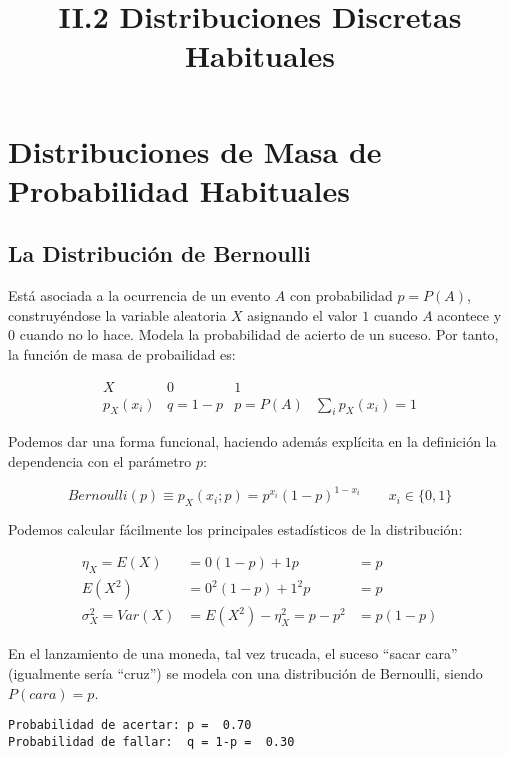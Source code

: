 \documentclass[11pt]{article}
\title{II.2 Distribuciones Discretas Habituales}
\begin{document}
    
    
    \maketitle
    
    \hypertarget{ii.-2-distribuciones-de-masa-de-probabilidad-habituales}{%
\section*{Distribuciones de Masa de Probabilidad
Habituales}\label{ii.-2-distribuciones-de-masa-de-probabilidad-habituales}}

\hypertarget{la-distribuciuxf3n-de-bernoulli}{%
\subsection*{La Distribución de
Bernoulli}\label{la-distribuciuxf3n-de-bernoulli}}

Está asociada a la ocurrencia de un evento \(A\) con probabilidad
\(p=P(A)\), construyéndose la variable aleatoria \(X\) asignando el
valor \(1\) cuando \(A\) acontece y \(0\) cuando no lo hace. Modela la
probabilidad de acierto de un suceso. Por tanto, la función de masa de
probailidad es:

\[
\begin{array}{c|cc|c}
X & 0 & 1\\
\hline
p_X(x_i) & q=1-p & p=P(A) & \sum_i p_X(x_i) = 1
\end{array}
\]

Podemos dar una forma funcional, haciendo además explícita en la
definición la dependencia con el parámetro \(p\):

\[Bernoulli(p) \equiv p_X(x_i;p)=p^{x_i}(1-p)^{1-x_i} \qquad x_i \in \{0,1\}\]

    Podemos calcular fácilmente los principales estadísticos de la
distribución:

\begin{align*}
\eta_X = E(X) &= 0(1-p)+1p &= p\\
E(X^2) &= 0^2(1-p)+1^2p &= p\\
\sigma_X^2=Var(X) &= E(X^2)-\eta_X^2 = p-p^2 &= p(1-p)
\end{align*}

En el lanzamiento de una moneda, tal vez trucada, el suceso ``sacar
cara'' (igualmente sería ``cruz'') se modela con una distribución de
Bernoulli, siendo \(P(cara)=p\).

    \begin{Verbatim}[commandchars=\\\{\}]
Probabilidad de acertar: p =  0.70 
Probabilidad de fallar:  q = 1-p =  0.30

    \end{Verbatim}
\end{document}
